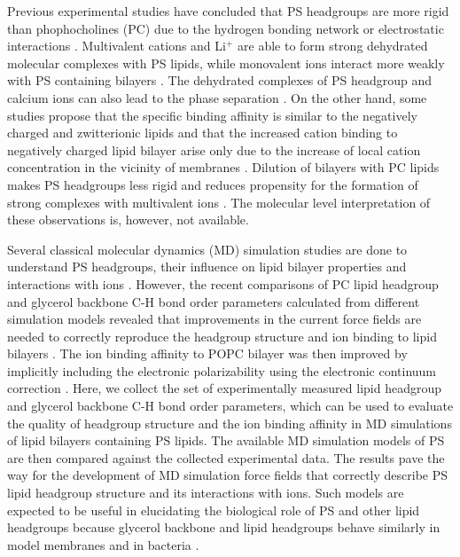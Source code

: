 \documentclass[aps,prl,superscriptaddress,twocolumn]{revtex4}
\begin{document}
Previous experimental studies have concluded that
PS headgroups are more rigid than phophocholines (PC)
due to the hydrogen bonding network or
electrostatic interactions \cite{browning80,buldt81}.
Multivalent cations and Li$^+$ are able to form strong
dehydrated molecular complexes with PS lipids,
while monovalent ions interact more weakly with PS
containing bilayers \cite{hauser77,kurland79,eisenberg79,hauser83,dluhy83,hauser85,feigenson86,mattai89,roux90,roux91,boettcher11}.
The dehydrated complexes of PS headgroup and calcium ions can also lead to the
phase separation \cite{hauser77,kurland79,hauser85,feigenson86,mattai89,roux90,roux91}.
On the other hand, some studies propose that the specific binding
affinity is similar to the negatively charged and zwitterionic lipids and that
the increased cation binding to negatively charged lipid bilayer arise only due
to the increase of local cation concentration in the vicinity of membranes \cite{seelig90,sinn06}.
Dilution of bilayers with PC lipids makes PS headgroups
less rigid and reduces propensity for the formation of
strong complexes with multivalent ions \cite{browning80,buldt81,roux90,roux91}.
The molecular level interpretation of these observations is,
however, not available.

Several classical molecular dynamics (MD) simulation studies are done
to understand PS headgroups, their influence on lipid bilayer properties and
interactions with ions \cite{cascales96,pandit02,mukhopadhyay04,pedersen06,vernier09,boettcher11,molina12,jurkiewicz12,venable13,pan14,vangaveti14,melcrova16}.
However, the recent comparisons of PC lipid headgroup and glycerol backbone
C-H bond order parameters calculated from different simulation models
revealed that improvements in the current force fields are needed
to correctly reproduce the headgroup structure and ion binding to
lipid bilayers \cite{botan15,catte16,ollila16}. The ion binding affinity
to POPC bilayer was then improved by implicitly including the electronic
polarizability using the electronic continuum correction \cite{melcr18}.
Here, we collect the set of experimentally measured lipid headgroup and
glycerol backbone C-H bond order parameters, which can be used to
evaluate the quality of headgroup structure and the ion binding affinity
in MD simulations of lipid bilayers containing PS lipids. 
The available MD simulation models of PS are then compared against
the collected experimental data. The results pave the way for the
development of MD simulation force fields that correctly describe
PS lipid headgroup structure and its interactions with ions.
Such models are expected to be useful in elucidating the biological
role of PS and other lipid headgroups because glycerol backbone and
lipid headgroups behave similarly in model membranes and in
bacteria \cite{gally81,scherer87,seelig90}.
\end{document}
